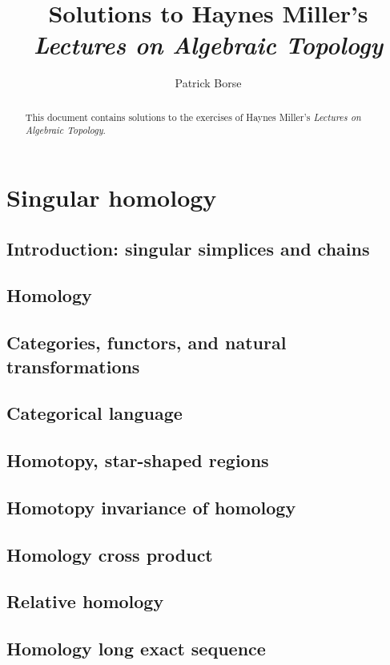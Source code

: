 \documentclass[oneside]{amsbook}
\title{Solutions to Haynes Miller's\\ \emph{Lectures on Algebraic Topology}}
\author{Patrick Borse}
\numberwithin{ex}{section}
\begin{document}
\begin{abstract}
This document contains solutions to the exercises of Haynes Miller's \emph{Lectures on Algebraic Topology}.
\end{abstract}

\maketitle

\tableofcontents

\chapter{Singular homology}
\section{Introduction: singular simplices and chains}

\section{Homology}

\section{Categories, functors, and natural transformations}

\section{Categorical language}

\section{Homotopy, star-shaped regions}

\section{Homotopy invariance of homology}

\section{Homology cross product}

\section{Relative homology}

\section{Homology long exact sequence}

\end{document}
